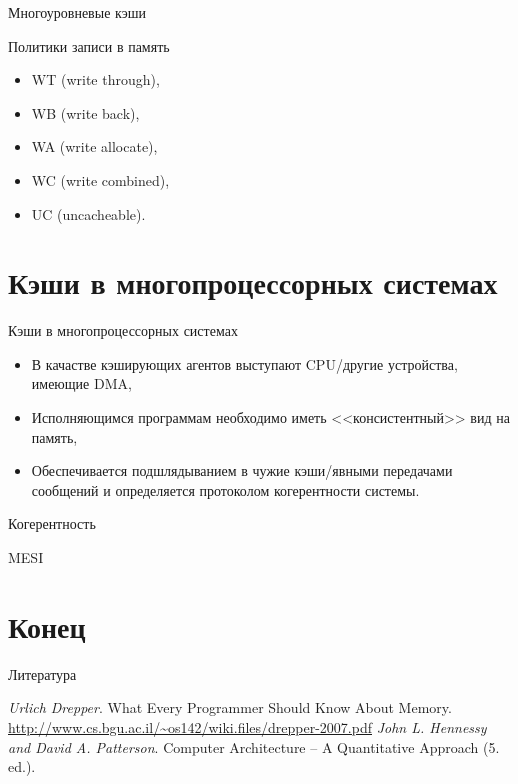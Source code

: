 \begin{frame}{Многоуровневые кэши}
\centering
{}
\end{frame}

\begin{frame}{Политики записи в память}
\begin{itemize}
    \item WT (write through),
    \item WB (write back),
    \item WA (write allocate),
    \item WC (write combined),
    \item UC (uncacheable).
\end{itemize}
\end{frame}

\section{Кэши в многопроцессорных системах}

\begin{frame}{Кэши в многопроцессорных системах}
\begin{itemize}
    \item В качастве кэширующих агентов выступают CPU/другие устройства, имеющие DMA,
    \item Исполняющимся программам необходимо иметь <<консистентный>> вид на память,
    \item Обеспечивается подшлядыванием в чужие кэши/явными передачами
    сообщений и определяется протоколом когерентности системы.
\end{itemize}
\end{frame}

\begin{frame}{Когерентность}
\todo
\end{frame}

\begin{frame}{MESI}
\end{frame}

\section*{Конец}

\begin{frame}[allowframebreaks]{Литература}
\begin{thebibliography}{99}
     \textit{Urlich Drepper}. What Every Programmer
    Should Know About Memory.
    \url{http://www.cs.bgu.ac.il/~os142/wiki.files/drepper-2007.pdf}
     \textit{John L. Hennessy and David A. Patterson}.
    Computer Architecture -- A Quantitative Approach (5. ed.).
\end{thebibliography}
\end{frame}

